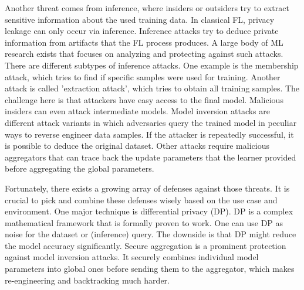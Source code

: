 Another threat comes from inference, where 
insiders or outsiders try to extract sensitive information
about the used training data.
In classical FL, privacy leakage can only occur via inference.
Inference attacks try to deduce private information from
artifacts that the FL process produces.
A large body of ML research exists that focuses on
analyzing and protecting against such attacks.
There are different subtypes of inference attacks.
One example is the membership attack, which tries to find if
specific samples were used for training.
Another attack is called 'extraction attack', which tries to
obtain all training samples.
The challenge here is that attackers have easy access to the final model.
Malicious insiders can even attack intermediate models.
Model inversion attacks are different attack variants in which adversaries
query the trained model in peculiar ways to reverse engineer data samples. 
If the attacker is repeatedly successful, it is possible to
deduce the original dataset.
Other attacks require malicious aggregators that can trace back
the update parameters that the learner provided before aggregating
the global parameters.

Fortunately, there exists a growing array of defenses against those threats.
It is crucial to pick and combine these defenses wisely based on the use case and environment.
One major technique is differential privacy (DP).
DP is a complex mathematical framework that is formally proven to work.
One can use DP as noise for the dataset or (inference) query.
The downside is that DP might reduce the model accuracy significantly.
Secure aggregation is a prominent protection against model inversion attacks.
It securely combines individual model parameters into global ones before
sending them to the aggregator, which makes re-engineering and backtracking much harder. \cite{paper:cluster-based-secure-aggregation-FL}